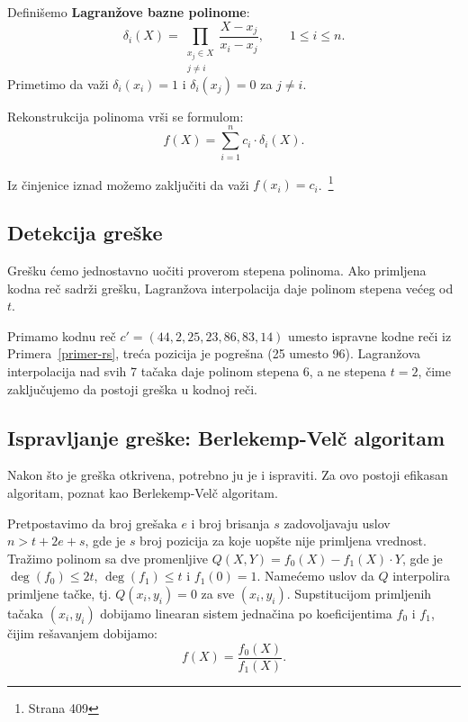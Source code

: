 Definišemo \textbf{Lagranžove bazne polinome}:
\[\delta_i(X) = \prod_{\substack{x_j \in X \\ j \neq i}} \frac{X - x_j}{x_i - x_j}, \qquad 1 \leq i \leq n.\]
Primetimo da važi $\delta_i(x_i) = 1$ i $\delta_i(x_j) = 0$ za $j \neq i$.

Rekonstrukcija polinoma vrši se formulom:
\[f(X) = \sum_{i=1}^{n} c_i \cdot \delta_i(X).\]
 
Iz činjenice iznad možemo zaključiti da važi $f(x_i) = c_i$.~\cite{smart2016cryptography}\footnote{Strana 409}
 
 \subsection{Detekcija greške}
 
 Grešku ćemo jednostavno uočiti proverom stepena polinoma.
Ako primljena kodna reč sadrži grešku, Lagranžova interpolacija daje polinom stepena većeg od $t$.
 
\begin{example}
Primamo kodnu reč $c' = (44, 2, 25, 23, 86, 83, 14)$ umesto ispravne kodne reči iz Primera~\ref{primer-rs}, treća pozicija je pogrešna (25 umesto 96). Lagranžova interpolacija nad svih 7 tačaka daje polinom stepena 6, a ne stepena $t=2$, čime zaključujemo da postoji greška u kodnoj reči.
\end{example}

\subsection{Ispravljanje greške: Berlekemp-Velč algoritam}
Nakon što je greška otkrivena, potrebno ju je i ispraviti. Za ovo postoji efikasan algoritam, poznat kao Berlekemp-Velč algoritam.
 
Pretpostavimo da broj grešaka $e$ i broj brisanja $s$ zadovoljavaju uslov $n > t + 2e + s$, gde je $s$ broj pozicija za koje uopšte nije primljena vrednost. Tražimo polinom sa dve promenljive $Q(X, Y) = f_0(X) - f_1(X) \cdot Y$, gde je $\deg(f_0) \leq 2t$, $\deg(f_1) \leq t$ i $f_1(0) = 1$. Namećemo uslov da $Q$ interpolira primljene tačke, tj. $Q(x_i, y_i) = 0$ za sve $(x_i, y_i)$. Supstitucijom primljenih tačaka $(x_i, y_i)$ dobijamo linearan sistem jednačina po koeficijentima $f_0$ i $f_1$, čijim rešavanjem dobijamo:
\[f(X) = \frac{f_0(X)}{f_1(X)}.\]
 
